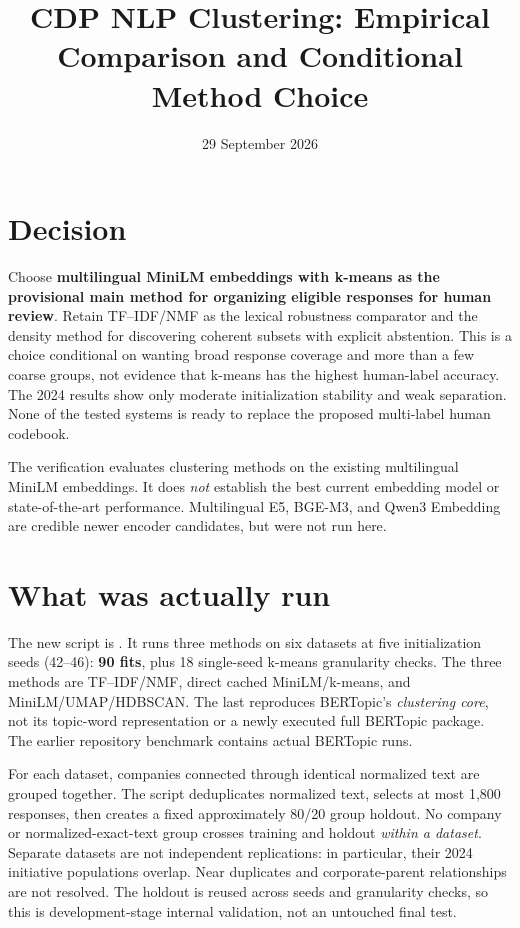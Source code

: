 \documentclass[11pt,a4paper]{article}
\title{CDP NLP Clustering: Empirical Comparison and Conditional Method Choice}
\author{}
\date{29 September 2026}
\begin{document}
\maketitle

\section{Decision}
Choose \textbf{multilingual MiniLM embeddings with k-means as the provisional
main method for organizing eligible responses for human review}.
Retain TF--IDF/NMF as the lexical robustness comparator and the density
method for discovering coherent subsets with explicit abstention.
This is a choice conditional on wanting broad response coverage and
more than a few coarse groups, not evidence that k-means has the highest
human-label accuracy. The 2024 results show only moderate initialization
stability and weak separation. None of the tested systems is ready to
replace the proposed multi-label human codebook.

The verification evaluates clustering methods on the existing multilingual
MiniLM embeddings. It does \emph{not} establish the best current embedding
model or state-of-the-art performance. Multilingual E5, BGE-M3, and Qwen3
Embedding are credible newer encoder candidates, but were not run here.

\section{What was actually run}
The new script is .
It runs three methods on six datasets at five initialization seeds
(42--46): \textbf{90 fits}, plus 18 single-seed k-means granularity checks.
The three methods are TF--IDF/NMF, direct cached MiniLM/k-means, and
MiniLM/UMAP/HDBSCAN. The last reproduces BERTopic's \emph{clustering core},
not its topic-word representation or a newly executed full BERTopic package.
The earlier repository benchmark contains actual BERTopic runs.

For each dataset, companies connected through identical normalized text
are grouped together. The script deduplicates normalized text, selects
at most 1,800 responses, then creates a fixed approximately 80/20
group holdout. No company or normalized-exact-text group crosses
training and holdout \emph{within a dataset}. Separate datasets are not
independent replications: in particular, their 2024 initiative populations
overlap. Near duplicates and corporate-parent relationships are not resolved.
The holdout is reused across seeds and granularity checks, so this is
development-stage internal validation, not an untouched final test.
\end{document}
